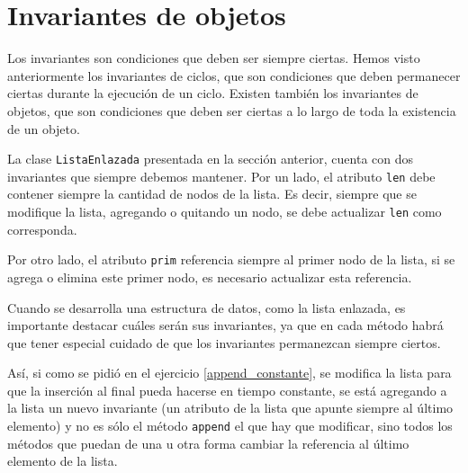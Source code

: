 

\section{Invariantes de objetos}

Los invariantes son condiciones que deben ser siempre ciertas.  Hemos visto
anteriormente los invariantes de ciclos, que son condiciones que deben
permanecer ciertas durante la ejecución de un ciclo.  Existen también los
invariantes de objetos, que son condiciones que deben ser ciertas a lo
largo de toda la existencia de un objeto.

La clase \lstinline!ListaEnlazada! presentada en la sección anterior,
cuenta con dos invariantes que siempre debemos mantener.  Por un lado, el
atributo \lstinline!len! debe contener siempre la cantidad de nodos de la
lista.  Es decir, siempre que se modifique la lista, agregando o quitando
un nodo, se debe actualizar \lstinline!len! como corresponda.

Por otro lado, el atributo \lstinline!prim! referencia siempre al primer
nodo de la lista, si se agrega o elimina este primer nodo, es necesario
actualizar esta referencia.

Cuando se desarrolla una estructura de datos, como la lista enlazada, es
importante destacar cuáles serán sus invariantes, ya que en cada método
habrá que tener especial cuidado de que los invariantes permanezcan siempre
ciertos.

Así, si como se pidió en el ejercicio \ref{append_constante}, se modifica
la lista para que la inserción al final pueda hacerse en tiempo constante,
se está agregando a la lista un nuevo invariante (un atributo de la lista
que apunte siempre al último elemento) y no es sólo el método
\lstinline!append! el que hay que modificar, sino todos los métodos que
puedan de una u otra forma cambiar la referencia al último elemento de la
lista.

